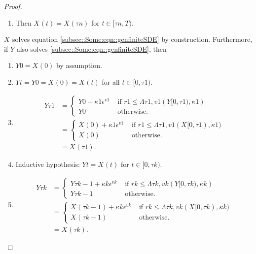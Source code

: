 \documentclass[12pt]{article}
\newcommand{\te}{\text}
\newcommand{\ep}{\epsilon}
\renewcommand{\v}{v}							%
\newcommand{\ev}{\ep}							%
\newcommand{\T}{T}								%
\renewcommand{\t}{t}							%
\newcommand{\X}{X}								%
\newcommand{\vind}[1]{^{#1}}					%
\newcommand{\cind}[1]{_{#1}}					%
\newcommand{\tp}[1]{(#1)}						%
\newcommand{\tip}[1]{#1}						%
\renewcommand{\r}{r}							%
\newcommand{\XX}{Y}								%
\newcommand{\rt}{\tau}							%
\renewcommand{\it}{k}							%
\renewcommand{\mark}{\kappa}					%
\newcommand{\ratee}{\Lambda}					%
\begin{document}
\begin{proof}
\begin{enumerate}
\item Then \(\X\cind{}\tp{\t} = \X\cind{}\tp{\rt{n}}\) for \(\t\in [\rt{n},\T)\).
\end{enumerate}

\(\X\cind{}\tip{}\) solves equation \eqref{subsec::Some:eqn::genfiniteSDE} by construction. Furthermore, if \(\XX{}{}\) also solves \eqref{subsec::Some:eqn::genfiniteSDE}, then 

\begin{enumerate}
\item \(\XX{}{0} = \X\cind{}\tp{0}\) by assumption.

\item \(\XX{}{\t} = \XX{}{0} = \X\cind{}\tp{0} = \X\cind{}\tp{\t}\) for all \(\t\in [0,\rt{1})\).

\item 

\begin{align*}
\XX{}{\rt{1}} &= \begin{cases}
\XX{}{0} + \mark{1}\ev\vind{\v{1}} &\te{ if } \r{1} \leq \ratee{\rt{1},\v{1}}(\XX{}{[0,\rt{1})},\mark{1})\\
\XX{}{0} &\te{ otherwise.}
\end{cases}\\
&= \begin{cases}
\X\cind{}\tp{0} + \mark{1}\ev\vind{\v{1}} &\te{ if } \r{1} \leq \ratee{\rt{1},\v{1}}(\X\cind{}\tip{[0,\rt{1})},\mark{1})\\
\X\cind{}\tp{0} &\te{ otherwise.}
\end{cases}\\
&= \X\cind{}\tp{\rt{1}}.
\end{align*}

\item Inductive hypothesis: \(\XX{}{\t} = \X\cind{}\tp{\t}\) for \(\t\in [0,\rt{\it})\). 

\item 

\begin{align*}
\XX{}{\rt{\it}} &= \begin{cases}
\XX{}{\rt{\it-1}} + \mark{\it}\ev\vind{\v{\it}} &\te{ if } \r{\it} \leq \ratee{\rt{\it},\v{\it}}(\XX{}{[0,\rt{\it})},\mark{\it})\\
\XX{}{\rt{\it-1}} &\te{ otherwise.}
\end{cases}\\
&= \begin{cases}
\X\cind{}\tp{\rt{\it-1}} + \mark{\it}\ev\vind{\v{\it}} &\te{ if } \r{\it} \leq \ratee{\rt{\it},\v{\it}}(\X\cind{}\tip{[0,\rt{\it})},\mark{\it})\\
\X\cind{}\tp{\rt{\it-1}} &\te{ otherwise.}
\end{cases}\\
&= \X\cind{}\tp{\rt{\it}}.
\end{align*}


\end{enumerate}
\end{proof}
\end{document}
